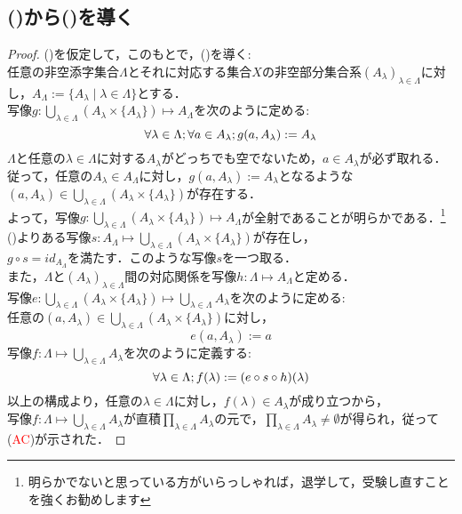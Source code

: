 \documentclass{jarticle}
\begin{document}
\subsection{()から()を導く}
\begin{proof}
	()を仮定して，このもとで，()を導く:\\
	任意の非空添字集合$\Lambda$とそれに対応する集合$X$の非空部分集合系$(A_{\lambda})_{\lambda \in \Lambda}$に対し，$A_\Lambda := \{ A_\lambda \mid \lambda \in \Lambda \}$とする．\\
	写像$g : \bigcup\limits_{\lambda \in \Lambda}(A_\lambda \times \{A_\lambda\}) \mapsto A_\Lambda$を次のように定める:\\
	$$
	\forall \lambda \in \Lambda ; \forall a \in A_\lambda ;\\
	g(a,A_\lambda) := A_\lambda
	$$
	$\Lambda$と任意の$\lambda \in \Lambda$に対する$A_\lambda$がどっちでも空でないため，$a \in A_\lambda$が必ず取れる．\\
	従って，任意の$A_\lambda \in A_{\Lambda}$に対し，$g(a,A_\lambda) := A_\lambda$となるような$(a,A_\lambda) \in \bigcup\limits_{\lambda \in \Lambda}(A_\lambda \times \{A_\lambda\})$が存在する．\\
	よって，写像$g:\bigcup\limits_{\lambda \in \Lambda}(A_\lambda \times \{A_\lambda\}) \mapsto A_\Lambda$が全射であることが明らかである．\footnote{明らかでないと思っている方がいらっしゃれば，退学して，受験し直すことを強くお勧めします}\\
	()よりある写像$s : A_\Lambda \mapsto \bigcup\limits_{\lambda \in \Lambda}(A_\lambda \times \{A_\lambda\}) $が存在し，\\
	$g \circ s = id_{A_\Lambda}$を満たす．このような写像$s$を一つ取る．\\
	また，$\Lambda $と$(A_\lambda)_{\lambda \in \Lambda}$間の対応関係を写像$h : \Lambda \mapsto A_\Lambda $と定める．\\
	写像$e: \bigcup\limits_{\lambda \in \Lambda}(A_\lambda \times \{A_\lambda\}) \mapsto \bigcup\limits_{\lambda \in \Lambda}A_\lambda$を次のように定める:\\
	任意の$(a,A_\lambda ) \in \bigcup\limits_{\lambda \in \Lambda}(A_\lambda \times \{A_\lambda\})$に対し，\\
	$$e(a,A_\lambda):= a$$
	写像$f: \Lambda \mapsto \bigcup_{\lambda \in \Lambda}A_\lambda$を次のように定義する:\\
	$$
	\forall \lambda \in \Lambda ; \\
	f(\lambda):=(e \circ s \circ h )(\lambda)
	$$
	以上の構成より，任意の$\lambda \in \Lambda$に対し，$f(\lambda) \in A_\lambda$が成り立つから，\\
	写像$f: \Lambda \mapsto \bigcup\limits_{\lambda \in \Lambda}A_\lambda$が直積$\prod\limits_{\lambda \in \Lambda}A_\lambda$の元で，$\prod\limits_{\lambda \in \Lambda}A_\lambda \neq \emptyset$が得られ，従って(\textcolor{red}{AC})が示された．

\end{proof}
\end{document}
